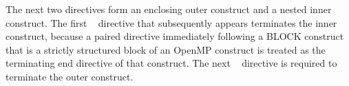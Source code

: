 The next two  directives form an enclosing outer  construct 
and a nested inner  construct. The first ~ directive
that subsequently appears terminates the inner  construct, 
because a paired  directive immediately following a BLOCK construct that is 
a strictly structured block of an OpenMP construct is treated as the terminating end directive 
of that construct. 
The next ~ directive is required to terminate the outer  construct.

